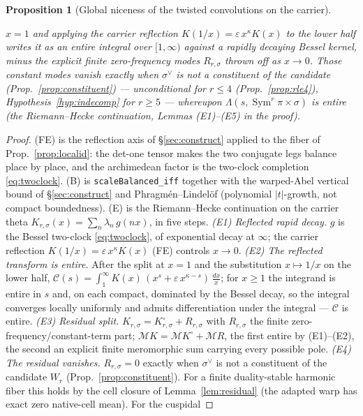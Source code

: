 \documentclass[11pt]{article}
\newtheorem{proposition}[theorem]{Proposition}
\theoremstyle{definition}
\newcommand{\Sym}{\operatorname{Sym}}
\begin{document}
\begin{proposition}[Global niceness of the twisted convolutions on the carrier]
\begin{enumerate}
$x=1$ and applying the carrier reflection $K(1/x)=\varepsilon\,x^{\kappa}K(x)$ to the lower half writes it
as an entire integral over $[1,\infty)$ against a rapidly decaying Bessel kernel, minus the explicit
finite zero-frequency modes $R_{r,\sigma}$ thrown off as $x\to0$. Those constant modes vanish exactly when
$\sigma^{\vee}$ is not a constituent of the candidate (Prop.~\ref{prop:constituent}) --- unconditional for
$r\le4$ (Prop.~\ref{prop:rle4}), Hypothesis~\ref{hyp:indecomp} for $r\ge5$ --- whereupon
$\Lambda(s,\Sym^r\pi\times\sigma)$ is entire (the Riemann--Hecke continuation, Lemmas \textup{(E1)--(E5)} in
the proof).
\end{enumerate}
\end{proposition}

\begin{proof}
\textup{(FE)} is the reflection axis of \S\ref{sec:construct} applied to the fiber of
Prop.~\ref{prop:localid}: the det-one tensor makes the two conjugate legs balance place by place, and the
archimedean factor is the two-clock completion \eqref{eq:twoclock}. \textup{(B)} is
\texttt{scaleBalanced\_iff} together with the warped-Abel vertical bound of \S\ref{sec:construct} and
Phragm\'en--Lindel\"of (polynomial $|t|$-growth, not compact boundedness).
\textup{(E)} is the Riemann--Hecke continuation on the carrier theta $K_{r,\sigma}(x)=\sum_n\lambda_n\,g(nx)$,
in five steps.
\emph{(E1) Reflected rapid decay.} $g$ is the Bessel two-clock \eqref{eq:twoclock}, of exponential decay at
$\infty$; the carrier reflection $K(1/x)=\varepsilon\,x^{\kappa}K(x)$ \textup{(FE)} controls $x\to0$.
\emph{(E2) The reflected transform is entire.} After the split at $x=1$ and the substitution $x\mapsto1/x$
on the lower half, $\mathcal C(s)=\int_1^\infty K(x)\,(x^{s}+\varepsilon\,x^{\kappa-s})\,\tfrac{dx}{x}$; for
$x\ge1$ the integrand is entire in $s$ and, on each compact, dominated by the Bessel decay, so the integral
converges locally uniformly and admits differentiation under the integral --- $\mathcal C$ is entire.
\emph{(E3) Residual split.} $K_{r,\sigma}=K^\circ_{r,\sigma}+R_{r,\sigma}$ with $R_{r,\sigma}$ the finite
zero-frequency/constant-term part; $\mathcal M K=\mathcal M K^\circ+\mathcal M R$, the first entire by
\textup{(E1)--(E2)}, the second an explicit finite meromorphic sum carrying every possible pole.
\emph{(E4) The residual vanishes.} $R_{r,\sigma}=0$ exactly when $\sigma^{\vee}$ is not a constituent of the
candidate $W_r$ (Prop.~\ref{prop:constituent}). For a finite duality-stable harmonic fiber this holds by the
cell closure of Lemma~\ref{lem:residual} (the adapted warp has exact zero native-cell mean). For the cuspidal

\end{proof}
\end{document}
